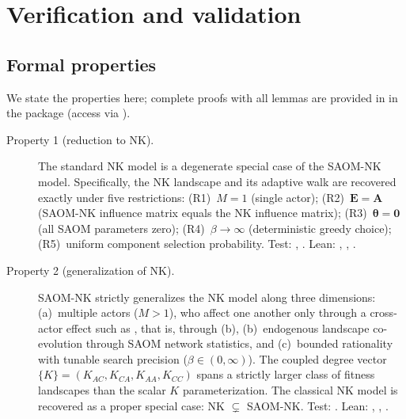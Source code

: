 \documentclass[
  article]{jss}
\begin{document}
\section{Verification and validation}\label{sec:verification}

\subsection{Formal properties}\label{sec:formal-properties}

We state the properties here; complete proofs with all lemmas are
provided in  in the package (access via
).

\begin{description}

\item[Property 1 (reduction to NK).] The standard NK model is a degenerate special case
of the SAOM-NK model.  Specifically, the NK landscape and its adaptive walk are
recovered exactly under five restrictions: (R1)~$M = 1$ (single actor);
(R2)~$\mathbf{E} = \mathbf{A}$ (SAOM-NK influence matrix equals the NK
influence matrix); (R3)~$\boldsymbol{\theta} = \mathbf{0}$ (all SAOM
parameters zero); (R4)~$\beta \to \infty$ (deterministic greedy choice);
(R5)~uniform component selection probability.
\newline Test: , .
\newline Lean: , , .

\item[Property 2 (generalization of NK).] SAOM-NK strictly generalizes the NK model
along three dimensions: (a)~multiple actors ($M > 1$), who affect one another
only through a cross-actor effect such as , that is, through (b), (b)~endogenous landscape co-evolution through SAOM network
statistics, and (c)~bounded rationality with tunable search precision
($\beta \in (0, \infty)$).  The coupled degree vector
$\{K\}= (K_{AC}, K_{CA}, K_{AA}, K_{CC})$ spans a strictly larger class of
fitness landscapes than the scalar $K$ parameterization.  The classical NK
model is recovered as a proper special case: NK $\subsetneq$ SAOM-NK.
\newline Test: .
\newline Lean: , , .


\end{description}
\end{document}
